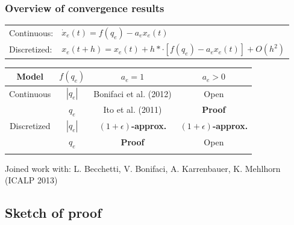 \documentclass[	hyperref={pdfpagelabels=false}, xcolor=dvipsnames,
		11pt]{beamer}
\begin{document}
\begin{frame}
    \frametitle{Overview of convergence results} 

     \begin{center}
	  
	 

	  \begin{tabular}{ll}
	   Continuous:		& $\dot{x}_e(t) = f(q_e) - a_e x_e(t)$ \\
	   Discretized: & $x_e(t+h) = x_e(t) + h* \cdot [ f(q_e) - a_e x_e(t) ] + O(h^2) $ \\ 
	  \end{tabular}
  
	  \vspace{0.5cm}

	  \begin{tabular}{cccc}
	  \toprule
	
	
		Model	  & $f(q_e)$	 	& $a_e = 1$ & $ a_e >0$ \\
	  \midrule
	  Continuous      & $|q_e|$     &  Bonifaci et al. (2012) 	& \alert{Open}   \\
			  & $q_e$       & Ito et al. (2011) 		& \textbf{\textcolor{OliveGreen}{Proof}} \\
	  Discretized     & $|q_e|$     & \textbf{\textcolor{OliveGreen}{$(1+\epsilon)$-approx.}}  & \textbf{\textcolor{OliveGreen}{$(1+\epsilon)$-approx.}}\\
			  & $q_e$	&  \textbf{\textcolor{OliveGreen}{Proof}}  & \alert{Open}\\		\\
	  \bottomrule
	  \end{tabular}

      \textcolor{OliveGreen}{\footnotesize{Joined work with: L. Becchetti, V. Bonifaci, A. Karrenbauer, K. Mehlhorn (ICALP 2013)}}
	  

      \end{center}
\end{frame}






\subsection{Sketch of proof}
\end{document}
